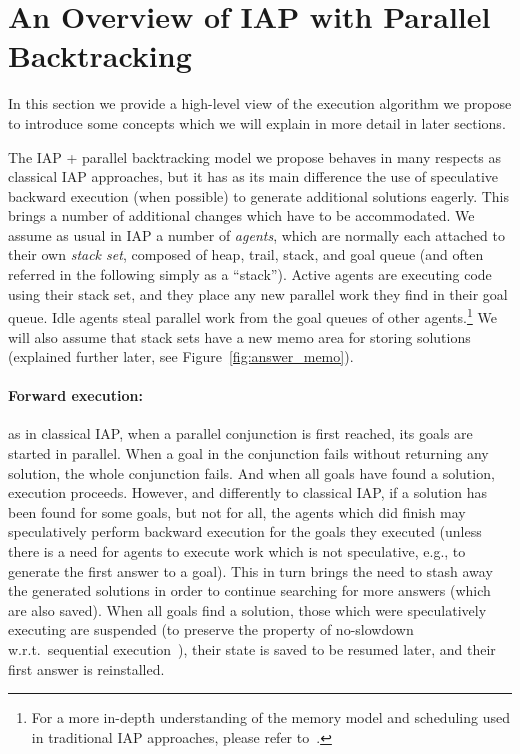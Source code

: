 \documentclass{tlp}
\newcommand{\compressection}{\vspace{-1em}}
\begin{document}
\compressection
\section{An Overview of IAP with Parallel Backtracking}
\label{sec:high-level-algorithm}

In this section we provide a high-level view of the execution
algorithm we propose
to introduce some concepts which we will explain in more detail in
later sections.


The IAP + parallel backtracking model we propose behaves in many
respects as classical IAP approaches, but it has as its main
difference the use of speculative backward execution (when possible)
to generate additional solutions eagerly.
This brings a number of additional changes which have to be
accommodated. We assume as usual in IAP a number of \emph{agents},
which are normally each attached to their own \emph{stack set},
composed of heap, trail, stack, and goal queue (and often referred in
the following simply as a ``stack''). Active agents are executing code
using their stack set, and they place any new parallel work they find
in their goal queue. Idle agents steal parallel work from the goal
queues of other agents.\footnote{For a more in-depth understanding of
  the memory model and scheduling used in traditional IAP approaches,
  please refer
  to~\cite{ngc-and-prolog,flexmem-europar96,partut-toplas}.}  We will
also assume that stack sets have a new memo area for storing solutions
(explained further later, see Figure~\ref{fig:answer_memo}).

\vspace{-0.5em}
\paragraph{Forward execution:}
as in classical IAP, when a parallel conjunction is first reached, its
goals are started in parallel.  When a goal in the conjunction fails
without returning any solution, the whole conjunction fails. And when
all goals have found a solution, execution proceeds.  However, 
and differently to classical IAP, if a
solution has been found for some goals, but not for all, the agents
which did finish may speculatively perform backward execution for the
goals they executed (unless there is a need for agents to execute work
which is not speculative, e.g., to generate the first answer to a goal).  This in turn brings the need to stash away
the generated solutions in order to continue searching for more
answers (which are also saved).  When all goals find a solution, those
which were speculatively executing are suspended (to preserve the
property of no-slowdown w.r.t.\ sequential
execution~\cite{sinsi-jlp}), their state is saved to be 
resumed later, and their first answer is reinstalled.
\end{document}
